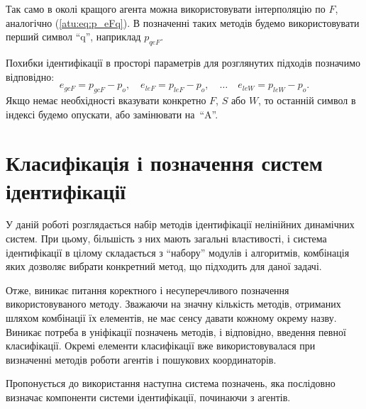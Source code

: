 Так само в околі кращого агента можна використовувати інтерполяцію по
$F$, аналогічно (\ref{atu:eq:p_eFq}). В позначенні таких методів будемо
використовувати перший символ ``q'', наприклад $p_{qeF}$.


Похибки ідентифікації в просторі параметрів для розглянутих підходів позначимо відповідно:
%
\begin{equation}
  e_{gcF} = p_{gcF} - p_o,
  \quad
  e_{leF} = p_{leF} - p_o,
  \quad
  \ldots
  \quad
  e_{leW} = p_{leW} - p_o.
  \label{atu:eq:e_xx}
\end{equation}
%
Якщо немає необхідності вказувати конкретно
$F$,
$S$ або
$W$, то останній символ в індексі будемо опускати, або замінювати на~``A''.







\section{Класифікація і позначення систем ідентифікації}%
\label{atu:id_classification}

У даній роботі розглядається набір методів ідентифікації нелінійних динамічних
систем. При цьому, більшість з них мають загальні властивості, і система
ідентифікації в цілому складається з ``набору'' модулів і алгоритмів,
комбінація яких дозволяє вибрати конкретний метод, що підходить для даної
задачі.

Отже, виникає питання коректного і несуперечливого позначення
використовуваного методу. Зважаючи на значну кількість методів,
отриманих шляхом комбінації їх елементів, не має сенсу давати
кожному окрему назву. Виникає потреба в уніфікації позначень
методів, і відповідно, введення певної класифікації. Окремі елементи
класифікації вже використовувалася при визначенні методів
роботи агентів і пошукових координаторів.

Пропонується до використання наступна система позначень, яка послідовно визначає
компоненти системи ідентифікації, починаючи з агентів.

